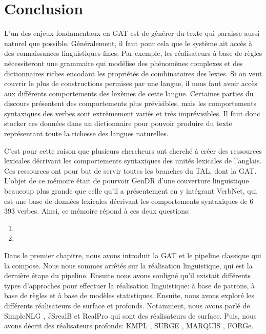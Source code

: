 
\chapter*{Conclusion}
L'un des enjeux fondamentaux en \ac{GAT} est de générer du texte qui paraisse aussi naturel que possible. Généralement, il faut pour cela que le système ait accès à des connaissances linguistiques fines. Par exemple, les réalisateurs à base de règles nécessiteront une grammaire qui modélise des phénomènes complexes et des dictionnaires riches encodant les propriétés de combinatoires des lexies. Si on veut couvrir le plus de constructions permises par une langue, il nous faut avoir accès aux différents comportements des lexèmes de cette langue. Certaines parties du discours présentent des comportements plus prévisibles, mais les comportements syntaxiques des verbes sont extrêmement variés et très imprévisibles. Il faut donc stocker ces données dans un dictionnaire pour pouvoir produire du texte représentant toute la richesse des langues naturelles.

C'est pour cette raison que plusieurs chercheurs ont cherché à créer des ressources lexicales décrivant les comportements syntaxiques des unités lexicales de l'anglais. Ces ressources ont pour but de servir toutes les branches du \ac{TAL}, dont la \ac{GAT}. L'objet de ce mémoire était de pourvoir GenDR d'une couverture linguistique beaucoup plus grande que celle qu'il a présentement en y intégrant VerbNet, qui est une base de données lexicales décrivant les comportements syntaxiques de 6\,393 verbes. Ainsi, ce mémoire répond à ces deux questions:

\begin{enumerate}
  \item {}
  \item {}
\end{enumerate}

Dans le premier chapitre, nous avons introduit la \ac{GAT} et le pipeline classique qui la compose. Nous nous sommes arrêtés sur la réalisation linguistique, qui est la dernière étape du pipeline. Ensuite nous avons souligné qu'il existait différents types d'approches pour effectuer la réalisation linguistique: à base de patrons, à base de règles et à base de modèles statistiques. Ensuite, nous avons exploré les différents réalisateurs de surface et profonds. Notamment, nous avons parlé de SimpleNLG \citep{GattSimpleNLGRealisationEngine2009}, JSrealB \citep{MolinsJSrealBBilingualText2015} et RealPro \citep{LavoieFastPortableRealizer1997} qui sont des réalisateurs de surface. Puis, nous avons décrit des réalisateurs profonds: KMPL \cite{BatemanEnablingTechnologyMultilingual1997}, SURGE \citep{Elhadad98surge:a}, MARQUIS \citep{WannerMARQUISGENERATIONUSERTAILORED2010}, FORGe\citep{MilledemoFORGePompeu2017}.

